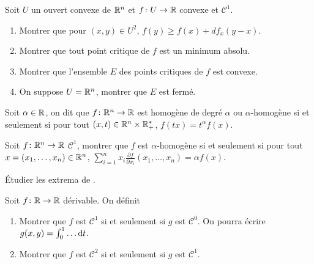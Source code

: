 \documentclass[12pt]{article}
\begin{document}
\begin{exercise}
	Soit $U$ un ouvert convexe de $\mathbb{R}^{n}$ et $f\colon U\to\mathbb{R}$ convexe et $\mathcal{C}^{1}$.
	\begin{enumerate}
		\item Montrer que pour $(x,y)\in U^{2}$, $f(y)\geqslant f(x)+df_{x}(y-x)$.
		\item Montrer que tout point critique de $f$ est un minimum absolu.
		\item Montrer que l'ensemble $E$ des points critiques de $f$ est convexe.
		\item On suppose $U=\mathbb{R}^{n}$, montrer que $E$ est fermé.
	\end{enumerate}
\end{exercise}

\begin{exercise}
	Soit $\alpha\in\mathbb{R}$, on dit que $f\colon\mathbb{R}^{n}\to\mathbb{R}$ est homogène de degré $\alpha$ ou $\alpha$-homogène si et seulement si pour tout $(x,t)\in\mathbb{R}^{n}\times\mathbb{R}_{+}^{*}$, $f(tx)=t^{\alpha}f(x)$.

	Soit $f\colon\mathbb{R}^{n}\to\mathbb{R}$ $\mathcal{C}^{1}$, montrer que $f$ est $\alpha$-homogène si et seulement si pour tout $x=(x_1,\dots,x_n)\in\mathbb{R}^{n}$, $\sum_{i=1}^{n}x_i\frac{\partial f}{\partial x_i}(x_1,\dots,x_n)=\alpha f(x)$.
\end{exercise}

\begin{exercise}
	Étudier les extrema de .
\end{exercise}

\begin{exercise}
	Soit $f\colon\mathbb{R}\to\mathbb{R}$ dérivable. On définit 
	\begin{enumerate}
		\item Montrer que $f$ est $\mathcal{C}^{1}$ si et seulement si $g$ est $\mathcal{C}^{0}$. On pourra écrire $g(x,y)=\int_{0}^{1}\dots \mathrm{d} t$.
		\item Montrer que $f$ est $\mathcal{C}^{2}$ si et seulement si $g$ est $\mathcal{C}^{1}$. 
	\end{enumerate}
\end{exercise}
\end{document}
